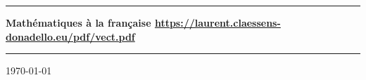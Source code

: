 
\thispagestyle{empty}
\begin{center}
  \begin{minipage}{15cm}
    \hrule\par
    \vspace{2mm}
    \begin{center}
        \Huge \bfseries Mathématiques à la française
    \normalsize
        \url{https://laurent.claessens-donadello.eu/pdf/vect.pdf}
    \end{center}
    \hrule\par
  \end{minipage}
\end{center}

\vspace{2cm}

\begin{center}

    \vspace{1cm}

    \today\\
    \texttt{\GitCommitHexsha}


\end{center}

\vfill

 \LogoEtLicence

 \newpage
